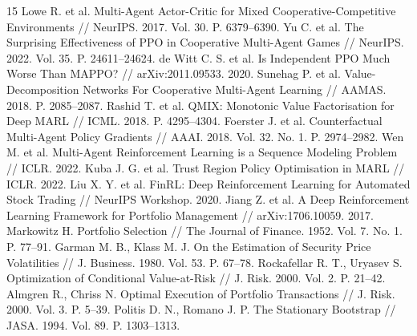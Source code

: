 \documentclass[11pt,a4paper]{article}
\begin{document}
\begin{thebibliography}{15}
 Lowe R. et al. Multi-Agent Actor-Critic for Mixed Cooperative-Competitive Environments // NeurIPS. 2017. Vol. 30. P. 6379--6390.
 Yu C. et al. The Surprising Effectiveness of PPO in Cooperative Multi-Agent Games // NeurIPS. 2022. Vol. 35. P. 24611--24624.
 de Witt C. S. et al. Is Independent PPO Much Worse Than MAPPO? // arXiv:2011.09533. 2020.
 Sunehag P. et al. Value-Decomposition Networks For Cooperative Multi-Agent Learning // AAMAS. 2018. P. 2085--2087.
 Rashid T. et al. QMIX: Monotonic Value Factorisation for Deep MARL // ICML. 2018. P. 4295--4304.
 Foerster J. et al. Counterfactual Multi-Agent Policy Gradients // AAAI. 2018. Vol. 32. No. 1. P. 2974--2982.
 Wen M. et al. Multi-Agent Reinforcement Learning is a Sequence Modeling Problem // ICLR. 2022.
 Kuba J. G. et al. Trust Region Policy Optimisation in MARL // ICLR. 2022.
 Liu X. Y. et al. FinRL: Deep Reinforcement Learning for Automated Stock Trading // NeurIPS Workshop. 2020.
 Jiang Z. et al. A Deep Reinforcement Learning Framework for Portfolio Management // arXiv:1706.10059. 2017.
 Markowitz H. Portfolio Selection // The Journal of Finance. 1952. Vol. 7. No. 1. P. 77--91.
 Garman M. B., Klass M. J. On the Estimation of Security Price Volatilities // J. Business. 1980. Vol. 53. P. 67--78.
 Rockafellar R. T., Uryasev S. Optimization of Conditional Value-at-Risk // J. Risk. 2000. Vol. 2. P. 21--42.
 Almgren R., Chriss N. Optimal Execution of Portfolio Transactions // J. Risk. 2000. Vol. 3. P. 5--39.
 Politis D. N., Romano J. P. The Stationary Bootstrap // JASA. 1994. Vol. 89. P. 1303--1313.
\end{thebibliography}
\end{document}
